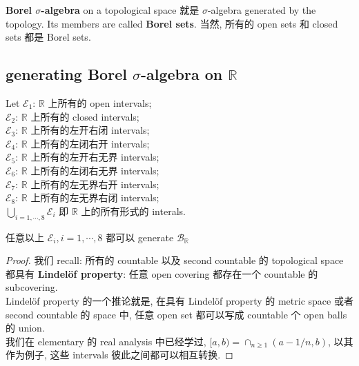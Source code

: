 \textbf{Borel \(\sigma\)-algebra} on a topological space 就是 \(\sigma\)-algebra generated by the topology. Its members are called \textbf{Borel sets}. 当然, 所有的 open sets 和 closed sets 都是 Borel sets.

\subsection{\texorpdfstring{generating Borel \(\sigma\)-algebra on \(\mathbb{R}\)}{generating Borel \textbackslash sigma-algebra on \textbackslash mathbb\{R\}}}\label{generating-borel-sigma-algebra-on-mathbbr}

\begin{example}

Let \(\mathcal{E}_{1}\): \(\mathbb{R}\) 上所有的 open intervals;\\
\(\mathcal{E}_{2}\): \(\mathbb{R}\) 上所有的 closed intervals;\\
\(\mathcal{E}_{3}\): \(\mathbb{R}\) 上所有的左开右闭 intervals;\\
\(\mathcal{E}_{4}\): \(\mathbb{R}\) 上所有的左闭右开 intervals;\\
\(\mathcal{E}_{5}\): \(\mathbb{R}\) 上所有的左开右无界 intervals;\\
\(\mathcal{E}_{6}\): \(\mathbb{R}\) 上所有的左闭右无界 intervals;\\
\(\mathcal{E}_{7}\): \(\mathbb{R}\) 上所有的左无界右开 intervals;\\
\(\mathcal{E}_{8}\): \(\mathbb{R}\) 上所有的左无界右闭 intervals;\\
\(\bigcup_{i = 1,\cdots,8}\mathcal{E}_{i}\) 即 \(\mathbb{R}\) 上的所有形式的 interals.

\begin{lemma}

任意以上 \(\mathcal{E}_{i},i = 1,\cdots,8\) 都可以 generate \(\mathcal{B}_{\mathbb{R}}\)

\end{lemma}

\end{example}

\begin{proof}

我们 recall: 所有的 countable 以及 second countable 的 topological space 都具有 \textbf{Lindelöf property}: 任意 open covering 都存在一个 countable 的 subcovering.\\
Lindelöf property 的一个推论就是, 在具有 Lindelöf property 的 metric space 或者 second countable 的 space 中, 任意 open set 都可以写成 countable 个 open balls 的 union.\\
我们在 elementary 的 real analysis 中已经学过, \(\lbrack a,b) = \cap_{n \geq 1}(a - 1/n,b)\), 以其作为例子, 这些 intervals 彼此之间都可以相互转换.

\end{proof}

